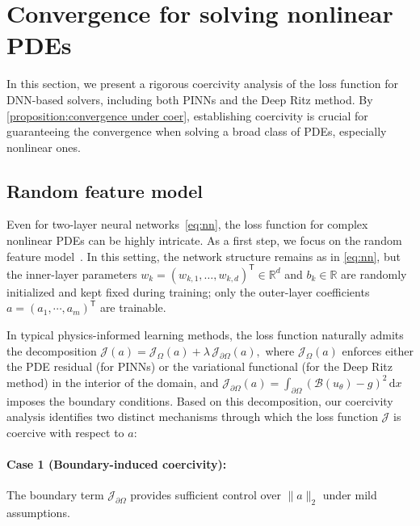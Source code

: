 \documentclass{article}
\newcommand{\T}{\mathsf{T}}
\begin{document}
\section{Convergence for solving nonlinear PDEs} \label{sec:main results}

In this section, we present a rigorous coercivity analysis of the loss function for DNN-based solvers, including both PINNs and the Deep Ritz method. 
By \cref{proposition:convergence under coer}, establishing coercivity is crucial for guaranteeing the convergence when solving a broad class of PDEs, especially nonlinear ones.

\subsection{Random feature model}\label{sec:rf}
Even for two-layer neural networks~\cref{eq:nn}, the loss function for complex nonlinear PDEs can be highly intricate.  
As a first step, we focus on the random feature model~\citep{chen2023random}. 
In this setting, the network structure remains as in \cref{eq:nn}, but the inner-layer parameters \( w_k = (w_{k,1}, \ldots, w_{k,d})^\T \in \mathbb{R}^d \) and \( b_k \in \mathbb{R} \) are randomly initialized and kept fixed during training; 
only the outer-layer coefficients \( a=(a_1,\cdots, a_m)^\T \) are trainable.

In typical physics-informed learning methods, the loss function naturally admits the decomposition
$
    \mathcal{J}(a) = \mathcal{J}_{\Omega}(a) + \lambda\, \mathcal{J}_{\partial\Omega}(a),
$
where $\mathcal{J}_{\Omega}(a)$ enforces either the PDE residual (for PINNs) or the variational functional (for the Deep Ritz method) in the interior of the domain, and
$
    \mathcal{J}_{\partial\Omega}(a) = \int_{\partial\Omega} \left( \mathcal{B}(u_{\theta}) - g \right)^2 \,\mathrm{d}x
$
imposes the boundary conditions. 
\iffalse
Based on this decomposition, our coercivity analysis identifies two distinct mechanisms through which the loss function $\mathcal{J}$ is coercive with respect to $a$:
\vspace{-8pt}
\paragraph{Case 1 (Boundary-induced coercivity):} The boundary term \(\mathcal{J}_{\partial\Omega}\) provides sufficient control over \(\|a\|_{2}\) under mild assumptions.
\vspace{-8pt}
\end{document}
